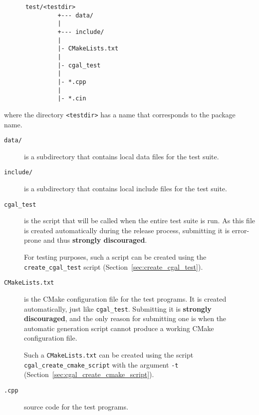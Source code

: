 \begin{verbatim}
      test/<testdir>
               +--- data/
               |
               +--- include/
               |
               |- CMakeLists.txt
               |
               |- cgal_test
               |
               |- *.cpp
               |
               |- *.cin
\end{verbatim}
where the directory \verb|<testdir>| has a name that corresponds to the package
name.

\begin{description}
   \item[{\tt data/}] is a subdirectory that contains local data files for the
        test suite.
   \item[{\tt include/}] is a subdirectory that contains local include files for
        the test suite.
   \item[{\tt cgal\_test}] is the script that will be called when the entire
        test suite is run. As this file is created automatically
        during the release process, submitting it is error-prone and
        thus {\bf strongly discouraged}.
        
        For testing purposes, such a script can be created using the
        {\tt create\_cgal\_test}%
        script (Section~\ref{sec:create_cgal_test}).  

   \item[{\tt CMakeLists.txt}] 
        is the CMake configuration file for the test programs. It is created
        automatically, just like {\tt cgal\_test}. Submitting it is 
        {\bf strongly discouraged}, and the only reason for submitting one is
        when the automatic generation script cannot produce a working CMake
        configuration file.
        
        Such a {\tt CMakeLists.txt} can be created using the script
        {\tt cgal\_create\_cmake\_script}%
        with the argument {\tt -t} 
        (Section~\ref{sec:cgal_create_cmake_script}).
   \item[{\tt *.cpp}] source code for the test programs.


\end{description}
